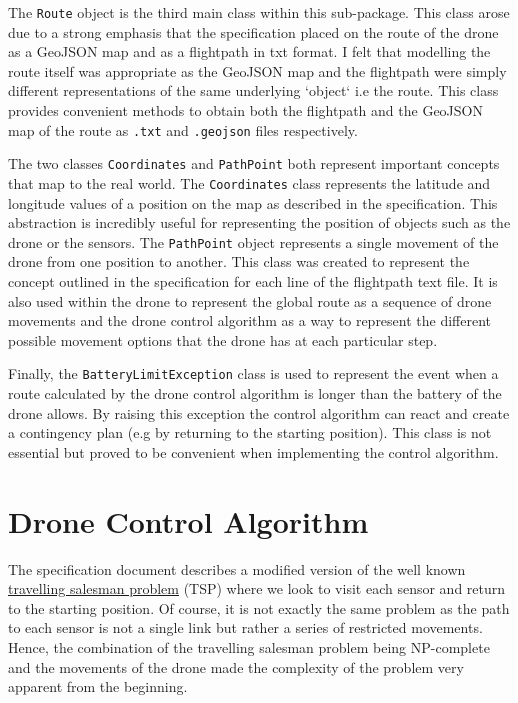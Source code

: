 \documentclass[11pt]{article}
\begin{document}
The \texttt{Route} object is the third main class within this sub-package. This class arose due to a strong emphasis that the specification placed on the route of the drone as a GeoJSON map and as a flightpath in txt format. I felt that modelling the route itself was appropriate as the GeoJSON map and the flightpath were simply different representations of the same underlying `object` i.e the route. This class provides convenient methods to obtain both the flightpath and the GeoJSON map of the route as \texttt{.txt} and \texttt{.geojson} files respectively.

The two classes \texttt{Coordinates} and \texttt{PathPoint} both represent important concepts that map to the real world. The \texttt{Coordinates} class represents the latitude and longitude values of a position on the map as described in the specification. This abstraction is incredibly useful for representing the position of objects such as the drone or the sensors. The \texttt{PathPoint} object represents a single movement of the drone from one position to another. This class was created to represent the concept outlined in the specification for each line of the flightpath text file. It is also used within the drone to represent the global route as a sequence of drone movements and the drone control algorithm as a way to represent the different possible movement options that the drone has at each particular step.

Finally, the \texttt{BatteryLimitException} class is used to represent the event when a route calculated by the drone control algorithm is longer than the battery of the drone allows. By raising this exception the control algorithm can react and create a contingency plan (e.g by returning to the starting position). This class is not essential but proved to be convenient when implementing the control algorithm.

\section{Drone Control Algorithm} \label{drone_alg}
The specification document describes a modified version of the well known \href{https://en.wikipedia.org/wiki/Travelling\_salesman\_problem}{travelling salesman problem} (TSP) where we look to visit each sensor and return to the starting position. Of course, it is not exactly the same problem as the path to each sensor is not a single link but rather a series of restricted movements. Hence, the combination of the travelling salesman problem being NP-complete and the movements of the drone made the complexity of the problem very apparent from the beginning.
\end{document}
